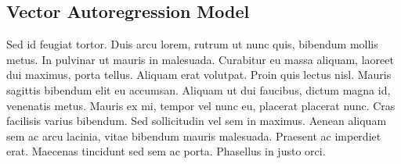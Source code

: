 \documentclass{article}
\begin{document}
\hypertarget{vector-autoregression-model}{%
\subsection{Vector Autoregression
Model}\label{vector-autoregression-model}}

Sed id feugiat tortor. Duis arcu lorem, rutrum ut nunc quis, bibendum
mollis metus. In pulvinar ut mauris in malesuada. Curabitur eu massa
aliquam, laoreet dui maximus, porta tellus. Aliquam erat volutpat. Proin
quis lectus nisl. Mauris sagittis bibendum elit eu accumsan. Aliquam ut
dui faucibus, dictum magna id, venenatis metus. Mauris ex mi, tempor vel
nunc eu, placerat placerat nunc. Cras facilisis varius bibendum. Sed
sollicitudin vel sem in maximus. Aenean aliquam sem ac arcu lacinia,
vitae bibendum mauris malesuada. Praesent ac imperdiet erat. Maecenas
tincidunt sed sem ac porta. Phasellus in justo orci.
\end{document}
